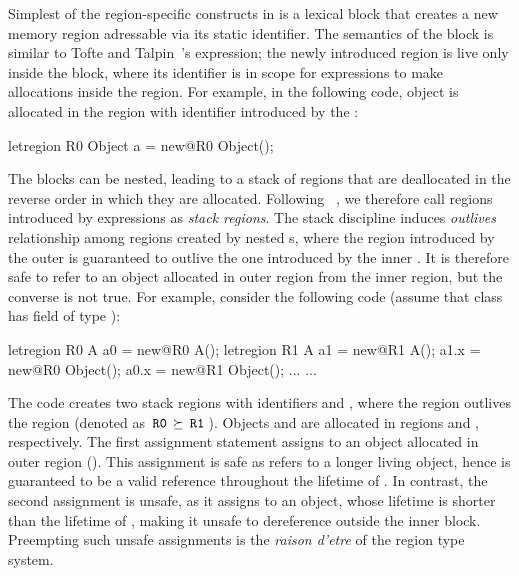 Simplest of the region-specific constructs in \name is a 
lexical block that creates a new memory region adressable via its
static identifier. The semantics of the  block is similar
to Tofte and Talpin~\cite{ttpopl94}'s  expression; the
newly introduced region is live only inside the block, where its
identifier is in scope for  expressions to make allocations
inside the region. For example, in the following code, object  is
allocated in the region with identifier  introduced by the
:
\begin{center}
\begin{codejava}
  letregion R0 {
    Object a = new@R0 Object();
  }
\end{codejava}
\end{center}
The  blocks can be nested, leading to a stack of regions
that are deallocated in the reverse order in which they are allocated.
Following ~\cite{cyclonepldi02}, we therefore call regions introduced
by  expressions as \emph{stack regions}. The stack
discipline induces \emph{outlives} relationship among regions created
by nested s, where the region introduced by the outer
 is guaranteed to outlive the one introduced by the inner
. It is therefore safe to refer to an object allocated in
outer region from the inner region, but the converse is not true. For
example, consider the following code (assume that class  has
field  of type ):
\begin{center}
\begin{codejava}
  letregion R0 {
    A a0 = new@R0 A();
    letregion R1 {
      A a1 = new@R1 A();
      a1.x = new@R0 Object();
      a0.x = new@R1 Object();
      ...
    }
    ...
  }
\end{codejava}
\end{center}
The code creates two stack regions with identifiers  and ,
where the region  outlives the region  (denoted as $\,{\tt R0}\,
\succeq \,{\tt R1}\,$).  Objects  and  are allocated in regions
 and , respectively. The first assignment statement
assigns to  an object allocated in outer region (). This
assignment is safe as  refers to a longer living object, hence
is guaranteed to be a valid reference throughout the lifetime of
.  In contrast, the second assignment is unsafe, as it assigns
to  an object, whose lifetime is shorter than the lifetime of
, making it unsafe to dereference  outside the inner
block. 
Preempting such unsafe assignments is the \emph{raison d'etre} of the
region type system.

